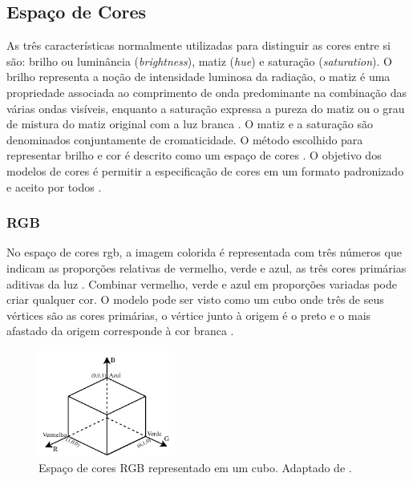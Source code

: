 \subsection{Espaço de Cores}

As três características normalmente utilizadas para distinguir as cores entre si são:
brilho ou luminância (\textit{brightness}), matiz (\textit{hue}) e saturação (\textit{saturation}). O brilho representa a noção de intensidade luminosa da radiação, o matiz é uma propriedade associada ao comprimento de
onda predominante na combinação das várias ondas visíveis, enquanto a saturação expressa a pureza do matiz ou o grau de mistura do matiz original com a luz branca \cite{marques1999processamento}. O matiz e a saturação são denominados conjuntamente de cromaticidade.
O método escolhido para representar brilho e cor é descrito como um espaço de cores \cite{richardson2010h}. O objetivo dos modelos de cores é permitir a especificação de cores em um formato padronizado e aceito por todos \cite{gonzalez2009processamento}. 

\subsubsection{RGB}
No espaço de cores \gls{rgb}, a imagem colorida é representada com três números que indicam as proporções relativas de vermelho, verde e azul, as três cores primárias aditivas da luz \cite{richardson2010h}. Combinar vermelho, verde e azul em proporções variadas pode criar qualquer cor. O modelo pode ser visto como um cubo onde três de seus vértices são as cores primárias, o vértice junto à origem é o preto e o mais afastado da origem corresponde à cor branca \cite{gonzalez2009processamento}. 

\begin{figure}[h]
	\centering
	\includegraphics[width=0.4\textwidth]{figuras/rgb.pdf}
	\caption[Espaço tridimensional de cores RGB.]{Espaço de cores RGB representado em um cubo. Adaptado de \cite{gonzalez2009processamento}.}
	\label{fig:rgb}
\end{figure}


